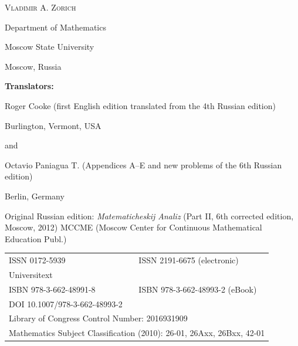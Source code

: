 \documentclass{article}
\begin{document}
{\scshape Vladimir A. Zorich}

\vspace{0.5cm}

Department of Mathematics

Moscow State University

Moscow, Russia

\vspace{1cm}

\noindent
\textbf{Translators:}

\vspace{0.2cm}

\noindent
Roger Cooke (first English edition translated from the 4th Russian edition)

\vspace{0.2cm}

\noindent
Burlington, Vermont, USA

\vspace{0.5cm}

\noindent
and

\vspace{0.2cm}

\noindent
Octavio Paniagua T. (Appendices A--E and new problems of the 6th Russian edition)

\vspace{0.2cm}

\noindent
Berlin, Germany

\vspace{1cm}

\noindent
Original Russian edition: \emph{Matematicheskij Analiz} (Part II, 6th corrected edition, Moscow,
2012) MCCME (Moscow Center for Continuous Mathematical Education Publ.)

\vspace{2cm}

\begin{tabular}{ll}
ISSN 0172-5939 & ISSN 2191-6675 (electronic) \\
Universitext & \\
ISBN 978-3-662-48991-8 & ISBN 978-3-662-48993-2 (eBook) \\
DOI 10.1007/978-3-662-48993-2 & \\
\multicolumn{2}{l}{Library of Congress Control Number: 2016931909} \\
\multicolumn{2}{l}{Mathematics Subject Classification (2010): 26-01, 26Axx, 26Bxx, 42-01}
\end{tabular}

\vspace{1cm}
\end{document}
